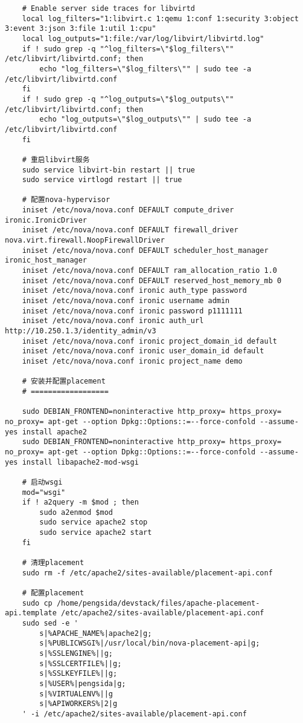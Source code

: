 \documentclass[a4paper,left=1.5cm,right=1.5cm,11pt]{article}
\begin{document}
\begin{lstlisting}
	# Enable server side traces for libvirtd
	local log_filters="1:libvirt.c 1:qemu 1:conf 1:security 3:object 3:event 3:json 3:file 1:util 1:cpu"
	local log_outputs="1:file:/var/log/libvirt/libvirtd.log"
	if ! sudo grep -q "^log_filters=\"$log_filters\"" /etc/libvirt/libvirtd.conf; then
		echo "log_filters=\"$log_filters\"" | sudo tee -a /etc/libvirt/libvirtd.conf
	fi
	if ! sudo grep -q "^log_outputs=\"$log_outputs\"" /etc/libvirt/libvirtd.conf; then
		echo "log_outputs=\"$log_outputs\"" | sudo tee -a /etc/libvirt/libvirtd.conf
	fi

	# 重启libvirt服务
	sudo service libvirt-bin restart || true
	sudo service virtlogd restart || true

	# 配置nova-hypervisor
	iniset /etc/nova/nova.conf DEFAULT compute_driver ironic.IronicDriver
    iniset /etc/nova/nova.conf DEFAULT firewall_driver nova.virt.firewall.NoopFirewallDriver
    iniset /etc/nova/nova.conf DEFAULT scheduler_host_manager ironic_host_manager
    iniset /etc/nova/nova.conf DEFAULT ram_allocation_ratio 1.0
    iniset /etc/nova/nova.conf DEFAULT reserved_host_memory_mb 0
    iniset /etc/nova/nova.conf ironic auth_type password
    iniset /etc/nova/nova.conf ironic username admin
    iniset /etc/nova/nova.conf ironic password p1111111
    iniset /etc/nova/nova.conf ironic auth_url http://10.250.1.3/identity_admin/v3
    iniset /etc/nova/nova.conf ironic project_domain_id default
    iniset /etc/nova/nova.conf ironic user_domain_id default
    iniset /etc/nova/nova.conf ironic project_name demo

	# 安装并配置placement
	# ==================

	sudo DEBIAN_FRONTEND=noninteractive http_proxy= https_proxy= no_proxy= apt-get --option Dpkg::Options::=--force-confold --assume-yes install apache2
	sudo DEBIAN_FRONTEND=noninteractive http_proxy= https_proxy= no_proxy= apt-get --option Dpkg::Options::=--force-confold --assume-yes install libapache2-mod-wsgi

	# 启动wsgi
	mod="wsgi"
	if ! a2query -m $mod ; then
		sudo a2enmod $mod
		sudo service apache2 stop
		sudo service apache2 start
	fi

	# 清理placement
	sudo rm -f /etc/apache2/sites-available/placement-api.conf

	# 配置placement
	sudo cp /home/pengsida/devstack/files/apache-placement-api.template /etc/apache2/sites-available/placement-api.conf
	sudo sed -e '
		s|%APACHE_NAME%|apache2|g;
		s|%PUBLICWSGI%|/usr/local/bin/nova-placement-api|g;
		s|%SSLENGINE%||g;
		s|%SSLCERTFILE%||g;
		s|%SSLKEYFILE%||g;
		s|%USER%|pengsida|g;
		s|%VIRTUALENV%||g
		s|%APIWORKERS%|2|g
	' -i /etc/apache2/sites-available/placement-api.conf


\end{lstlisting}
\end{document}
